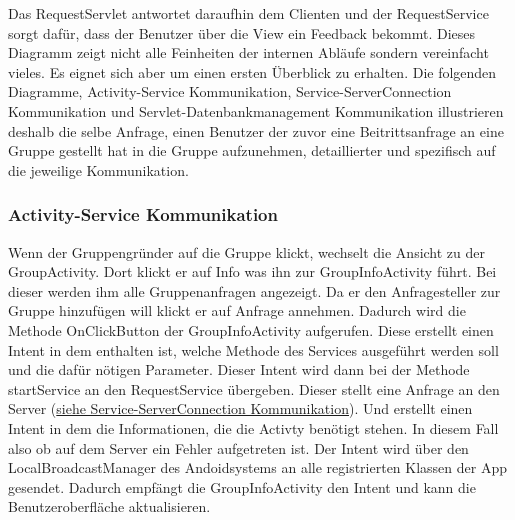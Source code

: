 Das RequestServlet antwortet daraufhin dem Clienten und der RequestService sorgt dafür, dass der Benutzer über die View ein Feedback bekommt. \newline
Dieses Diagramm zeigt nicht alle Feinheiten der internen Abläufe sondern vereinfacht vieles. Es eignet sich aber um einen ersten Überblick zu erhalten.
Die folgenden Diagramme, Activity-Service Kommunikation, Service-ServerConnection Kommunikation und Servlet-Datenbankmanagement Kommunikation illustrieren deshalb die selbe Anfrage, einen Benutzer der zuvor eine Beitrittsanfrage an eine Gruppe gestellt hat in die Gruppe aufzunehmen, detaillierter und spezifisch auf die jeweilige Kommunikation.

\subsubsection{Activity-Service Kommunikation}

\begin {center}
\end {center}
	Wenn der Gruppengründer auf die Gruppe klickt, wechselt die Ansicht zu der GroupActivity. Dort klickt er auf Info was ihn zur GroupInfoActivity führt. Bei dieser werden ihm alle Gruppenanfragen angezeigt. Da er den Anfragesteller zur Gruppe  hinzufügen will klickt er auf Anfrage annehmen. Dadurch wird die Methode OnClickButton der GroupInfoActivity aufgerufen. Diese erstellt einen Intent in dem enthalten ist, welche Methode des Services ausgeführt werden soll und die dafür nötigen Parameter. 
Dieser Intent wird dann bei der Methode startService an den RequestService übergeben. Dieser stellt eine Anfrage an den Server (\hyperlink{ServiceServerConnection}{siehe Service-ServerConnection Kommunikation}). Und erstellt einen Intent in dem die Informationen, die die Activty benötigt stehen. In diesem Fall also ob auf dem Server ein Fehler aufgetreten ist.
Der Intent wird über den LocalBroadcastManager des Andoidsystems an alle registrierten Klassen der App gesendet. Dadurch empfängt die GroupInfoActivity den Intent und kann die Benutzeroberfläche aktualisieren.


